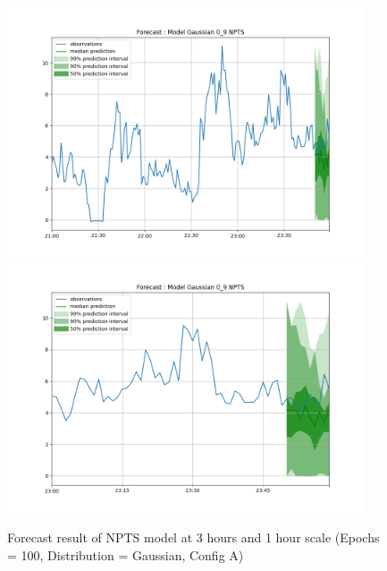 \documentclass[a4paper, 12pt]{article}
\begin{document}
\begin{figure}[!h]
    \centering
    \includegraphics[width=400px]{plots/forecast/a/model/Gaussian/0_9/NPTS/180.png}
    \includegraphics[width=400px]{plots/forecast/a/model/Gaussian/0_9/NPTS/60.png}
    \caption{Forecast result of NPTS model at 3 hours and 1 hour scale (Epochs = 100, Distribution = Gaussian, Config A)}
    \label{fig:mqrnn}
\end{figure}
\end{document}
